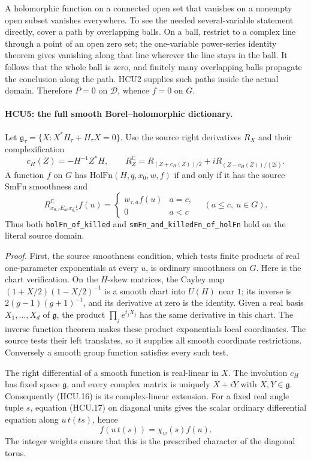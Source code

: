 A holomorphic function on a connected open set that vanishes on a
nonempty open subset vanishes everywhere.  To see the needed
several-variable statement directly, cover a path by overlapping balls.
On a ball, restrict to a complex line through a point of an open zero
set; the one-variable power-series identity theorem gives vanishing
along that line wherever the line stays in the ball.  It follows that
the whole ball is zero, and finitely many overlapping balls propagate
the conclusion along the path.  HCU2 supplies such paths inside the
actual domain.  Therefore \(P=0\) on \(\mathcal D\), whence \(f=0\)
on \(G\).

\paragraph{HCU5: the full smooth Borel--holomorphic dictionary.}
\label{claim:HCU5}
Let \(\mathfrak g_\tau=\{X:X^*H_\tau+H_\tau X=0\}\).
Use the source right derivatives \(R_X\) and their complexification
\[
 c_H(Z)=-H^{-1}Z^*H,\qquad
 R_Z^{\mathbb C}
 =R_{(Z+c_H(Z))/2}
    +iR_{(Z-c_H(Z))/(2i)}.
 \tag{HCU.16}
\]
A function \(f\) on \(G\) has \(\mathrm{HolFn}(H,q,x_0,w,f)\) if and
only if it has the source \(\mathrm{SmFn}\) smoothness and
\[
 R^{\mathbb C}_{x_{0,\tau}E_{ac}x_{0,\tau}^{-1}}f(u)
   =\begin{cases}w_{\tau,a}f(u)&a=c,\\0&a<c\end{cases}
 \quad(a\le c,\ u\in G).
 \tag{HCU.17}
\]
Thus both \texttt{holFn\_of\_killed} and
\texttt{smFn\_and\_killedFn\_of\_holFn} hold on the literal source domain.

\emph{Proof.}
First, the source smoothness condition, which tests finite products of
real one-parameter exponentials at every \(u\), is ordinary smoothness
on \(G\).  Here is the chart verification.  On the \(H\)-skew matrices,
the Cayley map
\((1+X/2)(1-X/2)^{-1}\) is a smooth chart into \(U(H)\) near \(1\);
its inverse is \(2(g-1)(g+1)^{-1}\), and its derivative at zero is the
identity.  Given a real basis \(X_1,\ldots,X_d\) of \(\mathfrak g\),
the product \(\prod_j e^{t_jX_j}\) has the same derivative in this chart.
The inverse function theorem makes these product exponentials local
coordinates.  The source tests their left translates, so it supplies
all smooth coordinate restrictions.  Conversely a smooth group function
satisfies every such test.

The right differential of a smooth function is real-linear in \(X\).
The involution \(c_H\) has fixed space \(\mathfrak g\), and every
complex matrix is uniquely \(X+iY\) with \(X,Y\in\mathfrak g\).
Consequently (HCU.16) is its complex-linear extension.
For a fixed real angle tuple \(s\), equation (HCU.17) on diagonal
units gives the scalar ordinary differential equation along
\(u\,t(ts)\), hence
\[
 f(u\,t(s))=\chi_w(s)f(u).
 \tag{HCU.18}
\]
The integer weights ensure that this is the prescribed character of
the diagonal torus.

